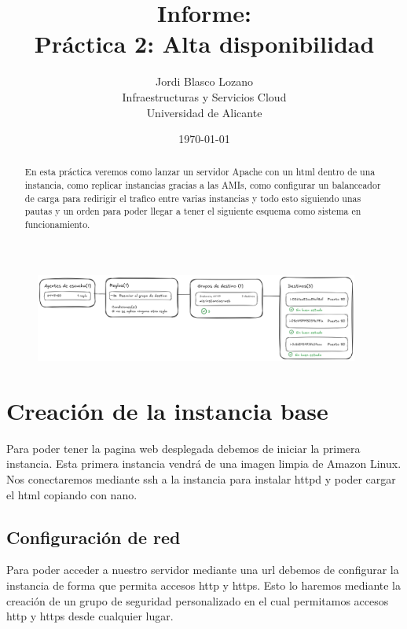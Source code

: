 \documentclass{article}
\title{Informe: \\ Práctica 2: Alta disponibilidad}
\author{
	Jordi Blasco Lozano \\
	\small Infraestructuras y Servicios Cloud \\
	\small Universidad de Alicante
}
\date{\today}
\begin{document}
	
	\maketitle

	\begin{abstract}
	\noindent En esta práctica veremos como lanzar un servidor Apache con un html dentro de una instancia, como replicar instancias gracias a las AMIs, como configurar un balanceador de carga para redirigir el trafico entre varias instancias y todo esto siguiendo unas pautas y un orden para poder llegar a tener el siguiente esquema como sistema en funcionamiento.
	\end{abstract}
	\begin{figure}[H]
	\centering
	\includegraphics[width=0.95\textwidth]{esquema.png}
	\end{figure}


	\tableofcontents

	\newpage

	\section{Creación de la instancia base}

		Para poder tener la pagina web desplegada debemos de iniciar la primera instancia. Esta primera instancia vendrá de una imagen limpia de Amazon Linux. Nos conectaremos mediante ssh a la instancia para instalar httpd y poder cargar el html copiando con nano.

	\subsection{Configuración de red}

		Para poder acceder a nuestro servidor mediante una url debemos de configurar la instancia de forma que permita accesos http y https. Esto lo haremos mediante la creación de un grupo de seguridad personalizado en el cual permitamos accesos http y https desde cualquier lugar. 
		
\end{document}
